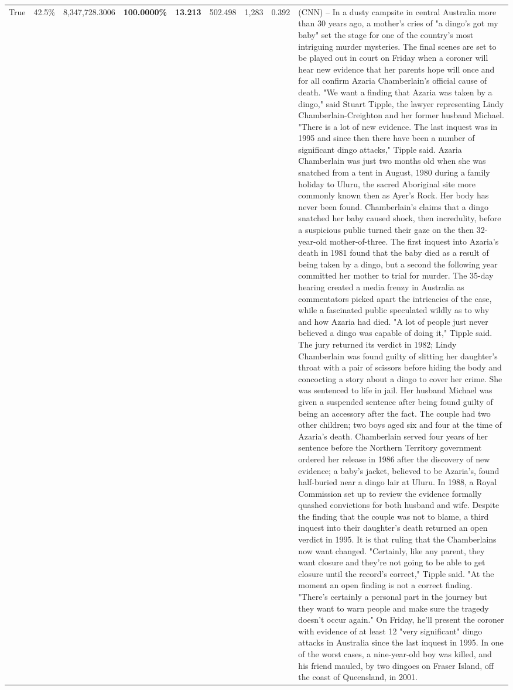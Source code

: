 \begin{table}[H]
\begin{tabular}{lllrlllll}
True & 42.5\% & 8,347,728.3006 & \bfseries \color{red} 100.0000\% & \bfseries \color{red} 13.213 & 502.498 & 1,283 & 0.392 & (CNN) -- In a dusty campsite in central Australia more than 30 years ago, a mother's cries of "a dingo's got my baby" set the stage for one of the country's most intriguing murder mysteries. The final scenes are set to be played out in court on Friday when a coroner will hear new evidence that her parents hope will once and for all confirm Azaria Chamberlain's official cause of death. "We want a finding that Azaria was taken by a dingo," said Stuart Tipple, the lawyer representing Lindy Chamberlain-Creighton and her former husband Michael. "There is a lot of new evidence. The last inquest was in 1995 and since then there have been a number of significant dingo attacks," Tipple said. Azaria Chamberlain was just two months old when she was snatched from a tent in August, 1980 during a family holiday to Uluru, the sacred Aboriginal site more commonly known then as Ayer's Rock. Her body has never been found. Chamberlain's claims that a dingo snatched her baby caused shock, then incredulity, before a suspicious public turned their gaze on the then 32-year-old mother-of-three. The first inquest into Azaria's death in 1981 found that the baby died as a result of being taken by a dingo, but a second the following year committed her mother to trial for murder. The 35-day hearing created a media frenzy in Australia as commentators picked apart the intricacies of the case, while a fascinated public speculated wildly as to why and how Azaria had died. "A lot of people just never believed a dingo was capable of doing it," Tipple said. The jury returned its verdict in 1982; Lindy Chamberlain was found guilty of slitting her daughter's throat with a pair of scissors before hiding the body and concocting a story about a dingo to cover her crime. She was sentenced to life in jail. Her husband Michael was given a suspended sentence after being found guilty of being an accessory after the fact. The couple had two other children; two boys aged six and four at the time of Azaria's death. Chamberlain served four years of her sentence before the Northern Territory government ordered her release in 1986 after the discovery of new evidence; a baby's jacket, believed to be Azaria's, found half-buried near a dingo lair at Uluru. In 1988, a Royal Commission set up to review the evidence formally quashed convictions for both husband and wife. Despite the finding that the couple was not to blame, a third inquest into their daughter's death returned an open verdict in 1995. It is that ruling that the Chamberlains now want changed. "Certainly, like any parent, they want closure and they're not going to be able to get closure until the record's correct," Tipple said. "At the moment an open finding is not a correct finding. "There's certainly a personal part in the journey but they want to warn people and make sure the tragedy doesn't occur again." On Friday, he'll present the coroner with evidence of at least 12 "very significant" dingo attacks in Australia since the last inquest in 1995. In one of the worst cases, a nine-year-old boy was killed, and his friend mauled, by two dingoes on Fraser Island, off the coast of Queensland, in 2001. 
\end{tabular}
\end{table}
